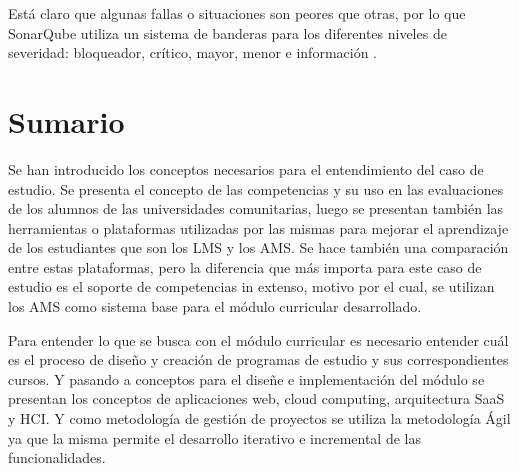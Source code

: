 Está claro que algunas fallas o situaciones son peores que otras, por lo que SonarQube utiliza un sistema de banderas para los diferentes niveles de severidad: bloqueador, crítico, mayor, menor e información \citep{campbell2013sonarqube}.

\section{Sumario}
Se han introducido los conceptos necesarios para el entendimiento del caso de estudio. Se presenta el concepto de las competencias y su uso en las evaluaciones de los alumnos de las universidades comunitarias, luego se presentan también las herramientas o plataformas utilizadas por las mismas para mejorar el aprendizaje de los estudiantes que son los LMS y los AMS. Se hace también una comparación entre estas plataformas, pero la diferencia que más importa para este caso de estudio es el soporte de competencias in extenso, motivo por el cual, se utilizan los AMS como sistema base para el módulo curricular desarrollado.

Para entender lo que se busca con el módulo curricular es necesario entender cuál es el proceso de diseño y creación de programas de estudio y sus correspondientes cursos. Y pasando a conceptos para el diseñe e implementación del módulo se presentan los conceptos de aplicaciones web, cloud computing, arquitectura SaaS y HCI. Y como metodología de gestión de proyectos se utiliza la metodología Ágil ya que la misma permite el desarrollo iterativo e incremental de las funcionalidades.